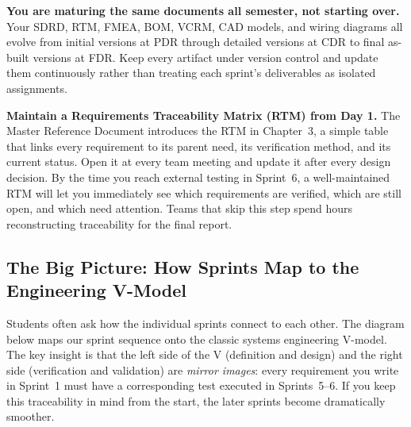 \begin{tipbox}
\textbf{You are maturing the same documents all semester, not starting over.} Your SDRD, RTM, FMEA, BOM, VCRM, CAD models, and wiring diagrams all evolve from initial versions at PDR through detailed versions at CDR to final as-built versions at FDR. Keep every artifact under version control and update them continuously rather than treating each sprint's deliverables as isolated assignments.
\end{tipbox}

\begin{protip}
\textbf{Maintain a Requirements Traceability Matrix (RTM) from Day 1.} The Master Reference Document introduces the RTM in Chapter~3, a simple table that links every requirement to its parent need, its verification method, and its current status. Open it at every team meeting and update it after every design decision. By the time you reach external testing in Sprint~6, a well-maintained RTM will let you immediately see which requirements are verified, which are still open, and which need attention. Teams that skip this step spend hours reconstructing traceability for the final report.
\end{protip}

\subsection{The Big Picture: How Sprints Map to the Engineering V-Model}

Students often ask how the individual sprints connect to each other. The diagram below maps our sprint sequence onto the classic systems engineering V-model. The key insight is that the left side of the V (definition and design) and the right side (verification and validation) are \textit{mirror images}: every requirement you write in Sprint~1 must have a corresponding test executed in Sprints~5--6. If you keep this traceability in mind from the start, the later sprints become dramatically smoother.

